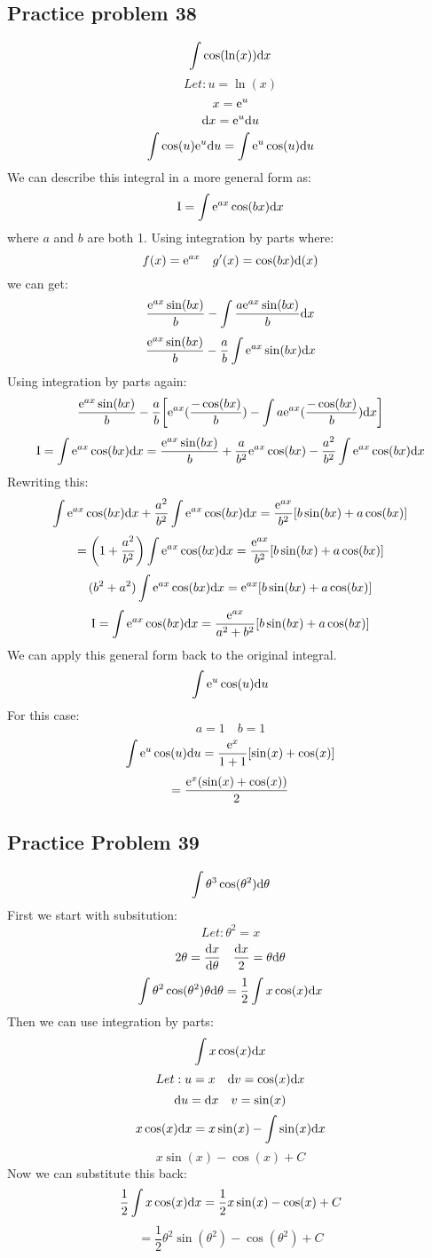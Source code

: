 \documentclass{math}
\begin{document}
\subsection*{Practice problem 38}
\[ \int{\cos(\ln(x))\mathrm{d}{x}} \]
\[ Let: u = \ln(x) \]
\[ x = \mathrm{e}^{u} \]
\[ \mathrm{d}{x} = \mathrm{e}^{u}\mathrm{d}{u} \]
\[ \int{\cos(u)\mathrm{e}^{u}\mathrm{d}{u}} = \int{\mathrm{e}^{u}\cos(u)\mathrm{d}{u}} \]
We can describe this integral in a more general form as:
\[ \mathrm{I} = \int{\mathrm{e}^{ax}\cos(bx)\mathrm{d}{x}} \]
where \( a \) and \( b \) are both 1. Using integration by parts where:
\[ f(x) = \mathrm{e}^{ax} \quad g'(x) = \cos(bx)\mathrm{d}(x) \]
we can get:
\[ \frac{\mathrm{e}^{ax}\sin(bx)}{b}-\int{\frac{a\mathrm{e}^{ax}\sin(bx)}{b}\mathrm{d}{x}} \]
\[ \frac{\mathrm{e}^{ax}\sin(bx)}{b}-\frac{a}{b}\int{\mathrm{e}^{ax}\sin(bx)\mathrm{d}{x}} \]
Using integration by parts again:
\[ \frac{\mathrm{e}^{ax}\sin(bx)}{b}-\frac{a}{b}\bigg[\mathrm{e}^{ax}(\frac{-\cos(bx)}{b})-
   \int{a\mathrm{e}^{ax}(\frac{-\cos(bx)}{b})\mathrm{d}{x}}\bigg] \]
\[ \mathrm{I} = \int{\mathrm{e}^{ax}\cos(bx)\mathrm{d}{x}} =
   \frac{\mathrm{e}^{ax}\sin(bx)}{b}+\frac{a}{b^{2}}\mathrm{e}^{ax}\cos(bx)-\frac{a^{2}}{b^{2}}
   \int{\mathrm{e}^{ax}\cos(bx)\mathrm{d}{x}} \]
Rewriting this:
\[ \int{\mathrm{e}^{ax}\cos(bx)\mathrm{d}{x}}+
   \frac{a^{2}}{b^{2}}\int{\mathrm{e}^{ax}\cos(bx)\mathrm{d}{x}} =
   \frac{\mathrm{e}^{ax}}{b^{2}}[b\sin(bx)+a\cos(bx)] \]
\[ = \bigg(1+\frac{a^{2}}{b^{2}}\bigg)\int{\mathrm{e}^{ax}\cos(bx)\mathrm{d}{x}} =
   \frac{\mathrm{e}^{ax}}{b^{2}}[b\sin(bx)+a\cos(bx)] \]
\[ (b^{2}+a^{2})\int{\mathrm{e}^{ax}\cos(bx)\mathrm{d}{x}} = \mathrm{e}^{ax}[b\sin(bx)+a\cos(bx)] \]
\[ \mathrm{I} = \int{\mathrm{e}^{ax}\cos(bx)\mathrm{d}{x}} =
   \frac{\mathrm{e}^{ax}}{a^{2}+b^{2}}[b\sin(bx)+a\cos(bx)] \]
We can apply this general form back to the original integral.
\[ \int{\mathrm{e}^{u}\cos(u)\mathrm{d}{u}} \]
For this case:
\[ a = 1 \quad b = 1 \]
\[ \int{\mathrm{e}^{u}\cos(u)\mathrm{d}{u}} = \frac{\mathrm{e}^{x}}{1+1}[\sin(x)+\cos(x)] \]
\[ = \frac{\mathrm{e}^{x}(\sin(x)+\cos(x))}{2} \]

\subsection*{Practice Problem 39}
\[ \int{\theta^{3}\cos(\theta^{2})\mathrm{d}{\theta}} \]
First we start with subsitution:
\[ Let: \theta^{2} = x \]
\[ 2\theta = \frac{\mathrm{d}{x}}{\mathrm{d}{\theta}} \quad
   \frac{\mathrm{d}{x}}{2} = \theta\mathrm{d}{\theta} \]
\[ \int{\theta^{2}\cos(\theta^{2})\theta\mathrm{d}{\theta}} =
   \frac{1}{2}\int{x\cos(x)\mathrm{d}{x}} \]
Then we can use integration by parts:
\[ \int{x\cos(x)\mathrm{d}{x}} \]
\[ Let: u = x \quad \mathrm{d}{v} = \cos(x)\mathrm{d}{x} \]
\[ \mathrm{d}{u} = \mathrm{d}{x} \quad v = \sin(x) \]
\[ x\cos(x)\mathrm{d}{x} = x\sin(x)-\int{\sin(x)\mathrm{d}{x}} \]
\[ x\sin(x)-\cos(x)+C \]
Now we can substitute this back:
\[ \frac{1}{2}\int{x\cos(x)\mathrm{d}{x}} = \frac{1}{2}x\sin(x)-\cos(x)+C \]
\[ = \frac{1}{2}\theta^{2}\sin(\theta^{2})-\cos(\theta^{2})+C \]
\end{document}
